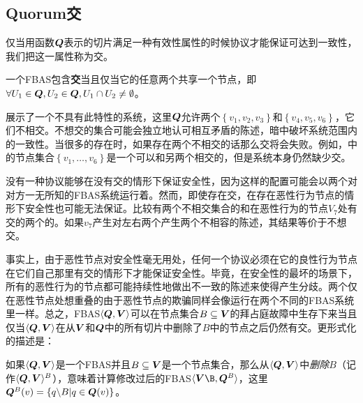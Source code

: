 \subsection{Quorum交}

仅当用函数${\bm Q}$表示的{\quorum}切片满足一种有效性属性的时候协议才能保证可达到一致性，我们把这一属性称为{\quorum}交。

\begin{definition}[{\quorum}交]
	一个FBAS包含\textbf{{\quorum}交}当且仅当它的任意两个{\quorum}共享一个节点，即$\forall U_1\in{\bm Q},U_2\in{\bm Q},U_1\cap U_2\neq\emptyset$。
\end{definition}

展示了一个不具有此特性的系统，这里${\bm Q}$允许两个{\quorum}$\left\{v_1,v_2,v_3\right\}$和$\left\{v_4,v_5,v_6\right\}$，它们不相交。不想交的集合可能会独立地认可相互矛盾的陈述，暗中破坏系统范围内的一致性。当很多的{\quorum}存在时，如果存在两个不相交的话那么{\quorum}交将会失败。例如，中的节点集合$\left\{v_1,\ldots ,v_6\right\}$是一个可以和另两个{\quorum}相交的{\quorum}，但是系统本身仍然缺少{\quorum}交。

没有一种协议能够在没有{\quorum}交的情形下保证安全性，因为这样的配置可能会以两个对对方一无所知的FBAS系统运行着。然而，即使存在{\quorum}交，在存在恶性行为节点的情形下安全性也可能无法保证。比较有两个不相交集合的和在恶性行为的节点$V_7$处有交的两个{\quorum}的。如果$v_7$产生对左右两个{\quorum}产生两个不相容的陈述，其结果等价于不想交{\quorum}。

事实上，由于恶性节点对安全性毫无用处，任何一个协议必须在它的良性行为节点在它们自己那里有{\quorum}交的情形下才能保证安全性。毕竟，在安全性的最坏的场景下，所有的恶性行为的节点都可能持续性地做出不一致的陈述来使得{\quorum}产生分歧。两个仅在恶性节点处想重叠的{\quorum}由于恶性节点的欺骗同样会像运行在两个不同的FBAS系统里一样。总之，FBAS$\langle {\bm Q},{\bm V}\rangle$可以在节点集合$B\subseteq {\bm V}$的拜占庭故障中生存下来当且仅当$\langle{\bm Q},{\bm V}\rangle$在从${\bm V}$和${\bm Q}$中的所有切片中删除了$B$中的节点之后仍然有{\quorum}交。更形式化的描述是：

\begin{definition}[删除]
	如果$\langle{\bm Q},{\bm V}\rangle$是一个FBAS并且$B\subseteq {\bm V}$是一个节点集合，那么从$\langle{\bm Q},{\bm V}\rangle$中\textit{删除}$B$（记作$\langle{\bm Q},{\bm V}\rangle^B$），意味着计算修改过后的FBAS$\langle\mybm{V}\B, \mybm{Q}^B\rangle$，这里${\bm Q}^B(v)=\left\{q\backslash B|q\in{\bm Q(v)}\right\}$。
\end{definition}

